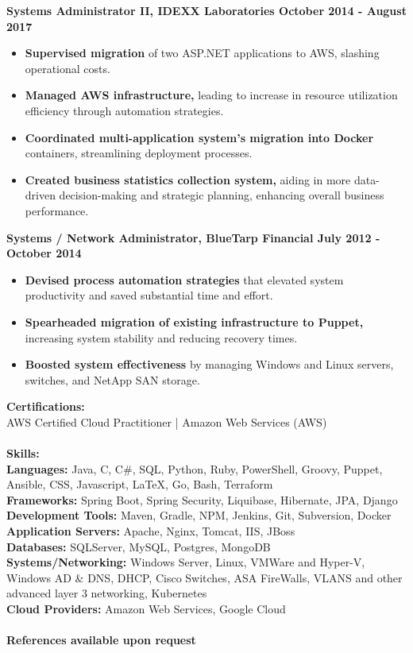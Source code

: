 \documentclass[10pt]{article}
\begin{document}
\normalsize
\noindent\textbf{Systems Administrator II, IDEXX Laboratories \hfill{October 2014 - August 2017}}\\
\normalsize 
\begin{itemize}
\small
\item \textbf{Supervised migration} of two ASP.NET applications to AWS, slashing operational costs.
\item \textbf{Managed AWS infrastructure,} leading to increase in resource utilization efficiency through automation strategies.
\item \textbf{Coordinated multi-application system's migration into Docker} containers, streamlining deployment processes.
\item \textbf{Created business statistics collection system,} aiding in more data-driven decision-making and strategic planning,
enhancing overall business performance.
\end{itemize}

\normalsize
\noindent\textbf{Systems / Network Administrator, BlueTarp Financial \hfill{July 2012 - October 2014}}\\
\normalsize 
\begin{itemize}
\small
\item \textbf{Devised process automation strategies} that elevated system productivity and saved substantial time and effort.
\item \textbf{Spearheaded migration of existing infrastructure to Puppet,} increasing system stability and reducing recovery times.
\item \textbf{Boosted system effectiveness} by managing Windows and Linux servers, switches, and NetApp SAN storage.
\end{itemize}

\noindent\Large\textbf{Certifications:}\\
\normalsize
AWS Certified Cloud Practitioner | Amazon Web Services (AWS)
\\
\\
\normalsize
\noindent\Large\textbf{Skills:}\\
\normalsize
\textbf{Languages:}
\normalsize Java, C, C{\#}, SQL, Python, Ruby, PowerShell, Groovy, Puppet, Ansible, CSS, Javascript, LaTeX, Go, Bash, Terraform \\
\textbf{Frameworks:}
\normalsize Spring Boot, Spring Security, Liquibase, Hibernate, JPA, Django \\
\textbf{Development Tools:}
\normalsize Maven, Gradle, NPM, Jenkins, Git, Subversion, Docker \\
\textbf{Application Servers:}
\normalsize Apache, Nginx, Tomcat, IIS, JBoss \\
\textbf{Databases:}
\normalsize SQLServer, MySQL, Postgres, MongoDB \\
\textbf{Systems/Networking:}
\normalsize Windows Server, Linux, VMWare and Hyper-V, Windows AD \& DNS, DHCP, Cisco Switches, ASA FireWalls, VLANS and other advanced layer 3 networking, Kubernetes \\
\textbf{Cloud Providers:}
\normalsize Amazon Web Services, Google Cloud
\\
\\
\noindent\Large\textbf{References available upon request}
\end{document}
